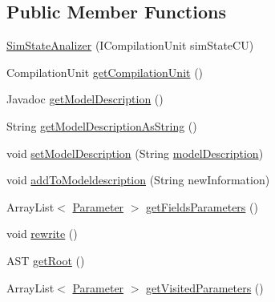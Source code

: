 \subsection*{Public Member Functions}
\begin{DoxyCompactItemize}
\item 
\hyperlink{classit_1_1isislab_1_1masonhelperdocumentation_1_1analizer_1_1_sim_state_analizer_a5cf1d13de70d5ea01a24c6a5fe4dea86}{Sim\-State\-Analizer} (I\-Compilation\-Unit sim\-State\-C\-U)
\item 
Compilation\-Unit \hyperlink{classit_1_1isislab_1_1masonhelperdocumentation_1_1analizer_1_1_sim_state_analizer_a491104053a47001b07f2a19606664dab}{get\-Compilation\-Unit} ()
\item 
Javadoc \hyperlink{classit_1_1isislab_1_1masonhelperdocumentation_1_1analizer_1_1_sim_state_analizer_a45d80ed2f5bd1f8fc300cdcb91b3d94d}{get\-Model\-Description} ()
\item 
String \hyperlink{classit_1_1isislab_1_1masonhelperdocumentation_1_1analizer_1_1_sim_state_analizer_ac6fb66774e9a11f54256d90457300036}{get\-Model\-Description\-As\-String} ()
\item 
void \hyperlink{classit_1_1isislab_1_1masonhelperdocumentation_1_1analizer_1_1_sim_state_analizer_a72ee1f15571941f5c588b71fd3265ab0}{set\-Model\-Description} (String \hyperlink{classit_1_1isislab_1_1masonhelperdocumentation_1_1analizer_1_1_sim_state_analizer_ac8f5070813b06b98ba48c864498b1c64}{model\-Description})
\item 
void \hyperlink{classit_1_1isislab_1_1masonhelperdocumentation_1_1analizer_1_1_sim_state_analizer_af9163f65e819887c0171fc423af5dd0a}{add\-To\-Modeldescription} (String new\-Information)
\item 
Array\-List$<$ \hyperlink{classit_1_1isislab_1_1masonhelperdocumentation_1_1analizer_1_1_parameter}{Parameter} $>$ \hyperlink{classit_1_1isislab_1_1masonhelperdocumentation_1_1analizer_1_1_sim_state_analizer_ae6db8ffe352384db9150c3f46825c9f0}{get\-Fields\-Parameters} ()
\item 
void \hyperlink{classit_1_1isislab_1_1masonhelperdocumentation_1_1analizer_1_1_sim_state_analizer_aa91938db714ec7b05134139ce741e61d}{rewrite} ()
\item 
A\-S\-T \hyperlink{classit_1_1isislab_1_1masonhelperdocumentation_1_1analizer_1_1_sim_state_analizer_a87990fc6efb2a06013ff8489ede4dcdf}{get\-Root} ()
\item 
Array\-List$<$ \hyperlink{classit_1_1isislab_1_1masonhelperdocumentation_1_1analizer_1_1_parameter}{Parameter} $>$ \hyperlink{classit_1_1isislab_1_1masonhelperdocumentation_1_1analizer_1_1_sim_state_analizer_a6a2c3cc8da53fb864eacebecfa5e7463}{get\-Visited\-Parameters} ()

\end{DoxyCompactItemize}
